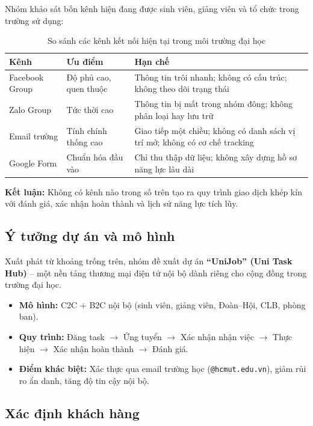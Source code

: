 Nhóm khảo sát bốn kênh hiện đang được sinh viên, giảng viên và tổ chức trong trường sử dụng:

\begin{table}[H]
\centering
\caption{So sánh các kênh kết nối hiện tại trong môi trường đại học}
\begin{tabularx}{\textwidth}{|p{2.4cm}|X|X|}
\hline
 \textbf{Kênh} & \textbf{Ưu điểm} & \textbf{Hạn chế} \\
\hline
Facebook Group & Độ phủ cao, quen thuộc & Thông tin trôi nhanh; không có cấu trúc; không theo dõi trạng thái \\
\hline
Zalo Group & Tức thời cao & Thông tin bị mất trong nhóm đông; không phân loại hay lưu trữ \\
\hline
Email trường & Tính chính thống cao & Giao tiếp một chiều; không có danh sách vị trí mở; không có cơ chế tracking \\
\hline
Google Form & Chuẩn hóa đầu vào & Chỉ thu thập dữ liệu; không xây dựng hồ sơ năng lực lâu dài \\
\hline
\end{tabularx}
\end{table}

\textbf{Kết luận:} Không có kênh nào trong số trên tạo ra quy trình giao dịch khép kín với
đánh giá, xác nhận hoàn thành và lịch sử năng lực tích lũy.

\subsection{Ý tưởng dự án và mô hình}

Xuất phát từ khoảng trống trên, nhóm đề xuất dự án \textbf{``UniJob'' (Uni Task Hub)} -- một
nền tảng thương mại điện tử nội bộ dành riêng cho cộng đồng trong trường đại học.

\begin{itemize}
  \item \textbf{Mô hình:} C2C + B2C nội bộ (sinh viên, giảng viên, Đoàn--Hội, CLB, phòng ban).
  \item \textbf{Quy trình:} Đăng task $\rightarrow$ Ứng tuyển $\rightarrow$ Xác nhận nhận việc
    $\rightarrow$ Thực hiện $\rightarrow$ Xác nhận hoàn thành $\rightarrow$ Đánh giá.
  \item \textbf{Điểm khác biệt:} Xác thực qua email trường học (\texttt{@hcmut.edu.vn}), giảm
    rủi ro ẩn danh, tăng độ tin cậy nội bộ.
\end{itemize}

\subsection{Xác định khách hàng}

